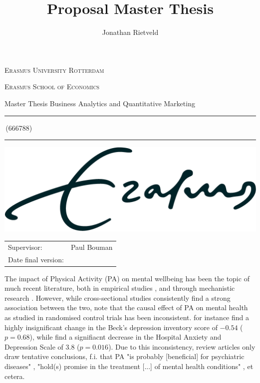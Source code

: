 \documentclass[a4paper,11pt]{report}
\author{Jonathan Rietveld}
\title{Proposal Master Thesis}
\newcommand{\studentnumber}{666788}
\newcommand{\program}{Business Analytics and Quantitative Marketing}
\newcommand{\supervisor}{Paul Bouman}
\begin{document}
\begin{titlepage}
\makeatletter
\begin{center}
	\textsc{Erasmus University Rotterdam}
	\par \textsc{Erasmus School of Economics}
	\par Master Thesis \program

	\vfill \hrule height .08em \bigskip
	\par\huge\@title\bigskip
	\par\Large\@author\,(\studentnumber)\bigskip
	\hrule height .08em\normalsize

	\vfill
	\includegraphics[width=\textwidth,height=0.15\textheight,keepaspectratio]{../eur}
	\vfill

	\begin{tabular}{ll}
		\toprule
		Supervisor: & \supervisor\\
		Date final version: & \@date\\
		\bottomrule
	\end{tabular}

	\vfill
\end{center}
\makeatother
\end{titlepage}

The impact of Physical Activity (PA) on mental wellbeing has been the topic of much recent literature,
both in empirical studies \cite{noetel2024effect, mahindru2023role}, and through mechanistic research \cite{smith2021role}.
However, while cross-sectional studies consistently find a strong association between the two, 
note that the causal effect of PA on mental health as studied in randomised control trials has been inconsistent.
 for instance find a highly insignificant change in the Beck's depression inventory score
of $-0.54$ ($p = 0.68$), while  find a signifiacnt decrease in the Hospital Anxiety and
Depression Scale of $3.8$ ($p = 0.016$).
Due to this inconsistency, review articles only draw tentative conclusions, f.i. that PA "is probably [beneficial]
for psychiatric diseases" \cite{peluso2005physical}, "hold(s) promise in the treatment [...] of mental health conditions"
\cite{smith2021role}, et cetera.
\end{document}
